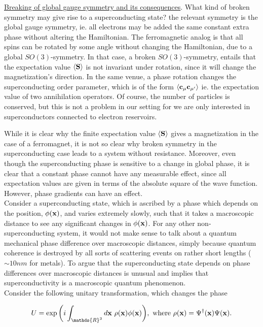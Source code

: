 \documentclass{homework}
\begin{document}
\underline{Breaking of global gauge symmetry and its consequences}. What kind of broken symmetry may give rise to a superconducting state? the relevant symmetry is the global gauge symmetry, ie. all electrons may be added the same constant extra phase without altering the Hamiltonian. The ferromagnetic analog is that all spins can be rotated by some angle without changing the Hamiltonian, due to a global $SO(3)$-symmetry. In that case, a broken $SO(3)$-symmetry, entails that the expectation value $\langle {
\bf S}\rangle$ is not invariant under rotation, since it will change the magnetization's direction. In the same venue, a phase rotation changes the superconducting order parameter, which is of the form $\langle {\bf c}_{\mu} {\bf c}_{\mu'} \rangle$ ie. the expectation value of two annihilation operators. Of course, the number of particles is conserved, but this is not a problem in our setting for we are only interested in superconductors connected to electron reservoirs. 

While it is clear why the finite expectation value $\langle {\bf S} \rangle$ gives a magnetization in the case of a ferromagnet, it is not so clear why broken symmetry in the superconducting case leads to a system without resistance. Moreover, even though the superconducting phase is sensitive to a change in global phase, it is clear that a constant phase cannot have any measurable effect, since all expectation values are given in terms of the absolute square of the wave function. However, phase gradients can have an effect. \\

Consider a superconducting state, which is ascribed by a phase which depends on the position, $\phi({\bf x})$, and varies extremely slowly, such that it takes a macroscopic distance to see any significant changes in $\phi({\bf x})$. For any other non-superconducting system, it would not make sense to talk about a quantum mechanical phase difference over macroscopic distances, simply because quantum coherence is destroyed by all sorts of scattering events on rather short lengths ($\sim 10 nm$ for metals). To argue that the superconducting state depends on phase differences over macroscopic distances is unusual and implies that superconductivity is a macroscopic quantum phenomenon. \\

Consider the following unitary transformation, which changes the phase 

$$
    U = \exp \bigg( i \int_{\mathds{R}^3} d{\bf x} \blanky \rho({\bf x}) \phi({\bf x}) \bigg), \textnormal{ where } \rho({\bf x}) =  \Psi^{\dagger}({\bf x}) \Psi({\bf x}).
$$
\end{document}
